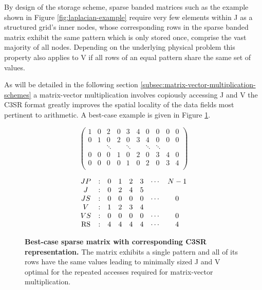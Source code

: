     By design of the storage scheme, sparse banded matrices such as the example shown in Figure
    \ref{fig:laplacian-example} require very few elements within J as a structured grid's inner nodes, whose
    corresponding rows in the sparse banded matrix exhibit the same pattern which is only stored once, comprise the vast
    majority of all nodes. Depending on the underlying physical problem this property also applies to V if all rows of
    an equal pattern share the same set of values. 

    As will be detailed in the following section \ref{subsec:matrix-vector-multiplication-schemes} a matrix-vector
    multiplication involves copiously accessing J and V the C3SR format greatly improves the spatial locality of the
    data fields most pertinent to arithmetic. A best-case example is given in Figure \ref{fig:c3sr-example-best-case}.

    \begin{figure}[ht]
      \centering
      \begin{minipage}{0.5\textwidth}
        \centering
        $$
        \begin{pmatrix}
          1 & 0 & 2 & 0 & 3 & 4 & 0 & 0 & 0 & 0 \\
          0 & 1 & 0 & 2 & 0 & 3 & 4 & 0 & 0 & 0 \\
            &   & \ddots &   & \ddots &   & \ddots & \ddots \\
          0 & 0 & 0 & 1 & 0 & 2 & 0 & 3 & 4 & 0 \\
          0 & 0 & 0 & 0 & 1 & 0 & 2 & 0 & 3 & 4 \\
        \end{pmatrix}
        $$
      \end{minipage}
      \begin{minipage}{0.4\textwidth}
        \centering
        $$
        \begin{matrix}
          JP & : & 0 & 1 & 2 & 3 & \cdots & N-1 \\
           J & : & 0 & 2 & 4 & 5 &        &     \\
          JS & : & 0 & 0 & 0 & 0 & \cdots &  0  \\
           V & : & 1 & 2 & 3 & 4 &        &     \\
          VS & : & 0 & 0 & 0 & 0 & \cdots &  0  \\
          \RS & : & 4 & 4 & 4 & 4 & \cdots &  4  \\
        \end{matrix}
        $$
      \end{minipage}
      \caption[Best-case sparse matrix with corresponding C3SR representation.]{\textbf{Best-case sparse matrix with corresponding C3SR representation.} The matrix exhibits a single pattern and all of its rows have the same values leading to minimally sized J and V optimal for the repeated accesses required for matrix-vector multiplication.}
      \label{fig:c3sr-example-best-case}
    \end{figure}

